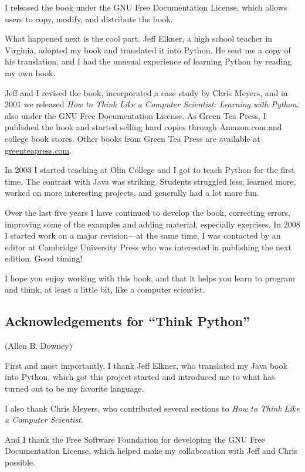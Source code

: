 \documentclass[10pt]{book}
\begin{document}
I released the book under the GNU Free Documentation License,
which allows users to copy, modify, and distribute the book.


What happened next is the cool part.  Jeff Elkner, a high school
teacher in Virginia, adopted my book and translated it into
Python.  He sent me a copy of his translation, and I had the
unusual experience of learning Python by reading my own book.

Jeff and I revised the book, incorporated a case study by
Chris Meyers, and in 2001 we released \emph{How to Think Like
a Computer Scientist: Learning with Python}, also under
the GNU Free Documentation License.
As Green Tea Press, I published the book and started selling
hard copies through Amazon.com and college book stores.
Other books from Green Tea Press are available at
\url{greenteapress.com}.

In 2003 I started teaching at Olin College and I got to teach
Python for the first time.  The contrast with Java was striking.
Students struggled less, learned more, worked on more interesting
projects, and generally had a lot more fun.

Over the last five years I have continued to develop the book,
correcting errors, improving some of the examples and
adding material, especially exercises.  In 2008 I started work
on a major revision---at the same time, I was
contacted by an editor at Cambridge University Press who
was interested in publishing the next edition.  Good timing!

I hope you enjoy working with this book, and that it helps
you learn to program and think, at least a little bit, like
a computer scientist.

\subsection*{Acknowledgements for ``Think Python''}

(Allen B. Downey)

First and most importantly, I thank Jeff Elkner, who
translated my Java book into Python, which got this project
started and introduced me to what has turned out to be my
favorite language.

I also thank Chris Meyers, who contributed several sections
to \emph{How to Think Like a Computer Scientist}.

And I thank the Free Software Foundation for developing
the GNU Free Documentation License, which helped make
my collaboration with Jeff and Chris possible.
\end{document}
